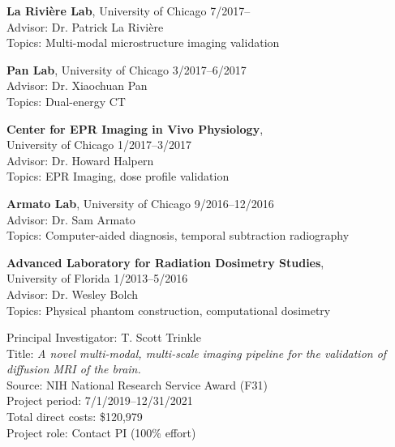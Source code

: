 \documentclass[10pt,letterpaper]{article}
\begin{document}
\begin{benumerate}{5}
\item
  {\textbf{La Rivi\`ere Lab}, University of Chicago} \hfill 7/2017--\\
  Advisor: Dr. Patrick La Rivi\`ere\\
  Topics: Multi-modal microstructure imaging validation
\item
  {\textbf{Pan Lab}, University of Chicago} \hfill 3/2017--6/2017\\
  Advisor: Dr. Xiaochuan Pan\\
  Topics: Dual-energy CT
\item
  {\textbf{Center for EPR Imaging in Vivo Physiology}, \\
    University of Chicago} \hfill 1/2017--3/2017\\
  Advisor: Dr. Howard Halpern\\
  Topics: EPR Imaging, dose profile validation
\item
  {\textbf{Armato Lab}, University of Chicago} \hfill 9/2016--12/2016\\
  Advisor: Dr. Sam Armato\\
  Topics: Computer-aided diagnosis, temporal subtraction radiography
\item
  {\textbf{Advanced Laboratory for Radiation Dosimetry Studies}, \\
    University of Florida} \hfill 1/2013--5/2016\\
  Advisor: Dr. Wesley Bolch\\
  Topics: Physical phantom construction, computational dosimetry
\end{benumerate}

\begin{benumerate}{1}
\item
  Principal Investigator: T. Scott Trinkle\\
  Title: \textit{A novel multi-modal, multi-scale imaging pipeline for the
    validation of diffusion MRI of the brain.}\\
  Source: NIH National Research Service Award (F31)\\
  Project period: 7/1/2019--12/31/2021\\
  Total direct costs: \$120,979\\
  Project role: Contact PI (100\% effort)
\end{benumerate}
\end{document}
